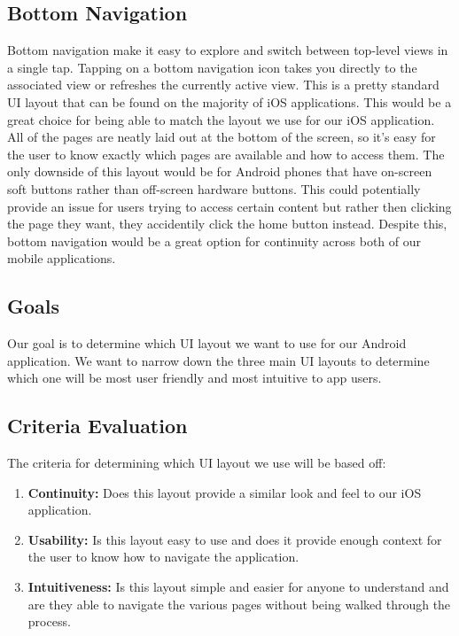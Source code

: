 \documentclass[letterpaper,10pt,draftclsnofoot,onecolumn,titlepage]{IEEEtran}
\begin{document}
		\subsection{Bottom Navigation}
			Bottom navigation make it easy to explore and switch between top-level views in a single tap.
			Tapping on a bottom navigation icon takes you directly to the associated view or refreshes the currently active view. \cite{Material-Bottom-Nav}
			This is a pretty standard UI layout that can be found on the majority of iOS applications.
			This would be a great choice for being able to match the layout we use for our iOS application.
			All of the pages are neatly laid out at the bottom of the screen, so it's easy for the user to know exactly which pages are available and how to access them.
			The only downside of this layout would be for Android phones that have on-screen soft buttons rather than off-screen hardware buttons.
			This could potentially provide an issue for users trying to access certain content but rather then clicking the page they want, they accidentily click the home button instead.
			Despite this, bottom navigation would be a great option for continuity across both of our mobile applications.

		\subsection{Goals}
			Our goal is to determine which UI layout we want to use for our Android application.
			We want to narrow down the three main UI layouts to determine which one will be most user friendly and most intuitive to app users.
		\subsection{Criteria Evaluation}
			The criteria for determining which UI layout we use will be based off:
			\begin{enumerate}
				\item \textbf{Continuity:} Does this layout provide a similar look and feel to our iOS application.
				\item \textbf{Usability:} Is this layout easy to use and does it provide enough context for the user to know how to navigate the application.
				\item \textbf{Intuitiveness:} Is this layout simple and easier for anyone to understand and are they able to navigate the various pages without being walked through the process.
			\end{enumerate}
\end{document}
